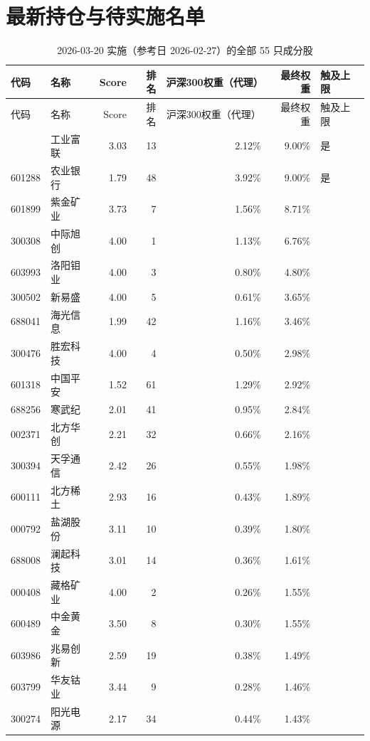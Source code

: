 \documentclass[11pt,a4paper]{article}
\begin{document}
\section{最新持仓与待实施名单}\label{app:holdings}
{\scriptsize
\begin{longtable}{@{}llrrrrl@{}}
\caption{2026-03-20 实施（参考日 2026-02-27）的全部 55 只成分股}\label{tab:holdings}\\
\toprule
代码 & 名称 & Score & 排名 & 沪深300权重（代理） & 最终权重 & 触及上限 \\
\midrule
\endfirsthead
\toprule
代码 & 名称 & Score & 排名 & 沪深300权重（代理） & 最终权重 & 触及上限 \\
\midrule
\endhead
\bottomrule
\endfoot
\endlastfoot
601138 & 工业富联 & 3.03 & 13 & 2.12\% & 9.00\% & 是 \\
601288 & 农业银行 & 1.79 & 48 & 3.92\% & 9.00\% & 是 \\
601899 & 紫金矿业 & 3.73 & 7 & 1.56\% & 8.71\% &  \\
300308 & 中际旭创 & 4.00 & 1 & 1.13\% & 6.76\% &  \\
603993 & 洛阳钼业 & 4.00 & 3 & 0.80\% & 4.80\% &  \\
300502 & 新易盛 & 4.00 & 5 & 0.61\% & 3.65\% &  \\
688041 & 海光信息 & 1.99 & 42 & 1.16\% & 3.46\% &  \\
300476 & 胜宏科技 & 4.00 & 4 & 0.50\% & 2.98\% &  \\
601318 & 中国平安 & 1.52 & 61 & 1.29\% & 2.92\% &  \\
688256 & 寒武纪 & 2.01 & 41 & 0.95\% & 2.84\% &  \\
002371 & 北方华创 & 2.21 & 32 & 0.66\% & 2.16\% &  \\
300394 & 天孚通信 & 2.42 & 26 & 0.55\% & 1.98\% &  \\
600111 & 北方稀土 & 2.93 & 16 & 0.43\% & 1.89\% &  \\
000792 & 盐湖股份 & 3.11 & 10 & 0.39\% & 1.80\% &  \\
688008 & 澜起科技 & 3.01 & 14 & 0.36\% & 1.61\% &  \\
000408 & 藏格矿业 & 4.00 & 2 & 0.26\% & 1.55\% &  \\
600489 & 中金黄金 & 3.50 & 8 & 0.30\% & 1.55\% &  \\
603986 & 兆易创新 & 2.59 & 19 & 0.38\% & 1.49\% &  \\
603799 & 华友钴业 & 3.44 & 9 & 0.28\% & 1.46\% &  \\
300274 & 阳光电源 & 2.17 & 34 & 0.44\% & 1.43\% &  \\

\end{longtable}}
\end{document}
